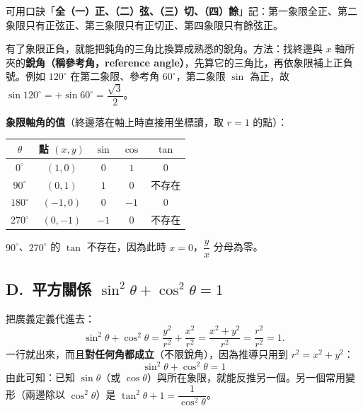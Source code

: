 \documentclass[11pt]{article}
\begin{document}
可用口訣「\textbf{全（一）正、（二）弦、（三）切、（四）餘}」記：第一象限全正、第二象限只有正弦正、第三象限只有正切正、第四象限只有餘弦正。

有了象限正負，就能把鈍角的三角比換算成熟悉的銳角。方法：找終邊與 $x$ 軸所夾的\textbf{銳角（稱參考角，reference angle）}，先算它的三角比，再依象限補上正負號。例如 $120^\circ$ 在第二象限、參考角 $60^\circ$，第二象限 $\sin$ 為正，故 $\sin120^\circ=+\sin60^\circ=\dfrac{\sqrt3}{2}$。

\textbf{象限軸角的值}（終邊落在軸上時直接用坐標讀，取 $r=1$ 的點）：

\begin{center}
\renewcommand{\arraystretch}{1.4}
\begin{tabular}{c|c|c|c|c}
\hline
$\theta$ & 點 $(x,y)$ & $\sin$ & $\cos$ & $\tan$ \\
\hline
$0^\circ$ & $(1,0)$ & $0$ & $1$ & $0$ \\
$90^\circ$ & $(0,1)$ & $1$ & $0$ & 不存在 \\
$180^\circ$ & $(-1,0)$ & $0$ & $-1$ & $0$ \\
$270^\circ$ & $(0,-1)$ & $-1$ & $0$ & 不存在 \\
\hline
\end{tabular}
\end{center}

$90^\circ$、$270^\circ$ 的 $\tan$ 不存在，因為此時 $x=0$，$\dfrac{y}{x}$ 分母為零。

\subsection*{\sffamily D.\ 平方關係 $\sin^2\theta+\cos^2\theta=1$}

把廣義定義代進去：
$$\sin^2\theta+\cos^2\theta=\frac{y^2}{r^2}+\frac{x^2}{r^2}=\frac{x^2+y^2}{r^2}=\frac{r^2}{r^2}=1.$$
一行就出來，而且\textbf{對任何角都成立}（不限銳角），因為推導只用到 $r^2=x^2+y^2$：
$$\boxed{\;\sin^2\theta+\cos^2\theta=1\;}$$
由此可知：已知 $\sin\theta$（或 $\cos\theta$）與所在象限，就能反推另一個。另一個常用變形（兩邊除以 $\cos^2\theta$）是 $\tan^2\theta+1=\dfrac{1}{\cos^2\theta}$。
\end{document}
